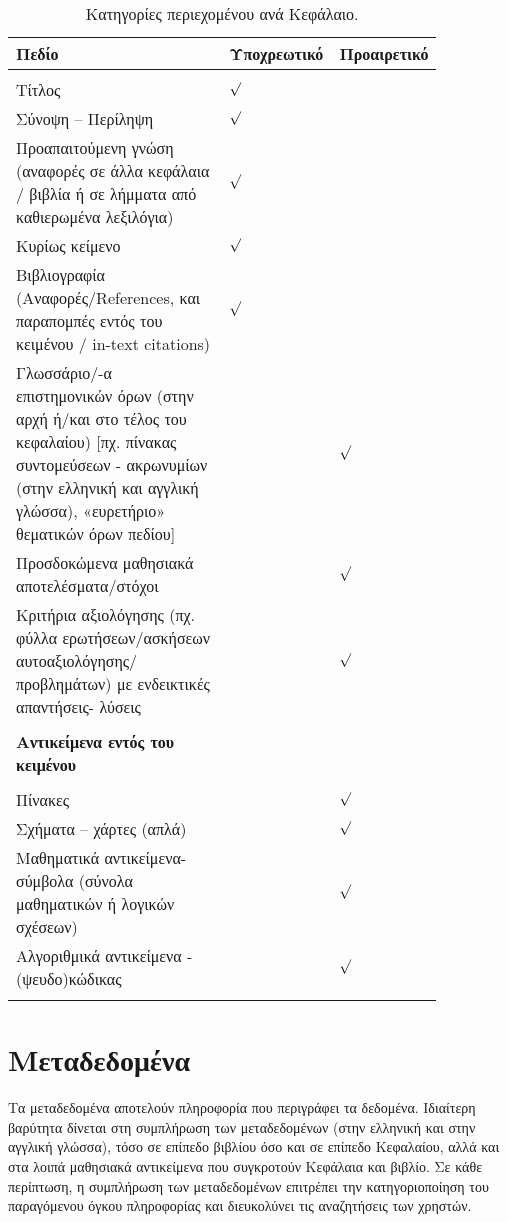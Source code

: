 \begin{table} [h] \centering
\caption{Κατηγορίες περιεχομένου ανά Κεφάλαιο.}
\vspace{2mm}
\begin{tabular} {p{0.55\linewidth} p{0.15\linewidth} p{0.15\linewidth}}
\hline
	\textbf{Πεδίο}	&\textbf{Υποχρεωτικό}	&\textbf{Προαιρετικό}\tabularnewline
\hline
		&	    &	\tabularnewline
Τίτλος		& \centering \centering $\surd$	    &\tabularnewline
Σύνοψη – Περίληψη	&\centering $\surd$	    	&	\tabularnewline
Προαπαιτούμενη γνώση (αναφορές σε άλλα κεφάλαια / βιβλία ή σε λήμματα από καθιερωμένα λεξιλόγια)& \centering $\surd$ &	\tabularnewline
Κυρίως κείμενο	&\centering $\surd$	    &	\tabularnewline
Βιβλιογραφία (Αναφορές/References, και παραπομπές εντός του κειμένου / in-text citations)	&\centering $\surd$	    &	\tabularnewline
Γλωσσάριο/-α επιστημονικών όρων (στην αρχή ή/και στο τέλος του κεφαλαίου) [πχ. πίνακας συντομεύσεων - ακρωνυμίων (στην ελληνική και αγγλική γλώσσα), «ευρετήριο» θεματικών όρων πεδίου]	&	    &\centering $\surd$	\tabularnewline
Προσδοκώμενα μαθησιακά αποτελέσματα/στόχοι	&	    &\centering $\surd$	\tabularnewline
Κριτήρια αξιολόγησης (πχ. φύλλα ερωτήσεων/ασκήσεων αυτοαξιολόγησης/προβλημάτων) με ενδεικτικές απαντήσεις- λύσεις	&	    &\centering $\surd$	\tabularnewline
	&	    &	\tabularnewline
\textbf{Αντικείμενα εντός του κειμένου} &	&		\tabularnewline
\hline
	&	    &	\tabularnewline
Πίνακες	&	    &\centering $\surd$	\tabularnewline
Σχήματα – χάρτες (απλά)	&	    &\centering $\surd$	\tabularnewline
Μαθηματικά αντικείμενα-σύμβολα (σύνολα μαθηματικών ή λογικών σχέσεων)	&	    &\centering $\surd$	\tabularnewline
Αλγοριθμικά αντικείμενα - (ψευδο)κώδικας	&	    &\centering $\surd$	\tabularnewline
	&	    &	\tabularnewline
\hline
\end{tabular}
\label{table:content}
\end{table}

\section{Μεταδεδομένα}
Τα μεταδεδομένα αποτελούν πληροφορία που περιγράφει τα δεδομένα. Ιδιαίτερη βαρύτητα
δίνεται στη συμπλήρωση των μεταδεδομένων (στην ελληνική και στην αγγλική γλώσσα),
τόσο σε επίπεδο βιβλίου όσο και σε επίπεδο Κεφαλαίου, αλλά και στα λοιπά  μαθησιακά
αντικείμενα  που  συγκροτούν Κεφάλαια και βιβλίο. Σε κάθε περίπτωση, η συμπλήρωση
των  μεταδεδομένων  επιτρέπει  την  κατηγοριοποίηση του  παραγόμενου  όγκου
πληροφορίας και διευκολύνει τις αναζητήσεις των χρηστών.

